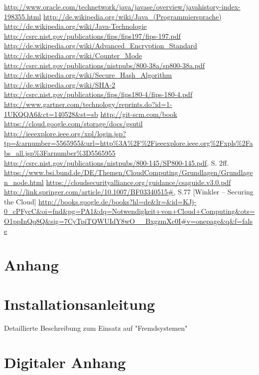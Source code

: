 \documentclass[12pt,a4paper,bibliography=totocnumbered,listof=totocnumbered]{scrartcl}
\begin{document}
 \begin{thebibliography}{xxxxxxxxxxxxxxxxxxx}
	\url{http://www.oracle.com/technetwork/java/javase/overview/javahistory-index-198355.html}
	\url{http://de.wikipedia.org/wiki/Java_(Programmiersprache)}
	\url{ http://de.wikipedia.org/wiki/Java-Technologie}
	\url{http://csrc.nist.gov/publications/fips/fips197/fips-197.pdf}
	\url{http://de.wikipedia.org/wiki/Advanced_Encryption_Standard}
	\url{http://de.wikipedia.org/wiki/Counter_Mode}
	\url{http://csrc.nist.gov/publications/nistpubs/800-38a/sp800-38a.pdf}
	\url{http://de.wikipedia.org/wiki/Secure_Hash_Algorithm}
	\url{http://de.wikipedia.org/wiki/SHA-2}
	\url{http://csrc.nist.gov/publications/fips/fips180-4/fips-180-4.pdf}
	\url{http://www.gartner.com/technology/reprints.do?id=1-1UKQQA6&ct=140528&st=sb}
 	\url{http://git-scm.com/book}
	\url{https://cloud.google.com/storage/docs/gsutil}	
	\url{http://ieeexplore.ieee.org/xpl/login.jsp?tp=&arnumber=5565955&url=http%3A%2F%2Fieeexplore.ieee.org%2Fxpls%2Fabs_all.jsp%3Farnumber%3D5565955}
	\url{http://csrc.nist.gov/publications/nistpubs/800-145/SP800-145.pdf}, S. 2ff.
	\url{https://www.bsi.bund.de/DE/Themen/CloudComputing/Grundlagen/Grundlagen_node.html}
	\url{https://cloudsecurityalliance.org/guidance/csaguide.v3.0.pdf}
	\url{http://link.springer.com/article/10.1007/BF03340515#},  S.77
	 [Winkler – Securing the Cloud]
	 \url{http://books.google.de/books?hl=de&lr=&id=KJj-0_cPFycC&oi=fnd&pg=PA1&dq=Notwendigkeit+von+Cloud+Computing&ots=O1ppInQq8Q&sig=7CyTpiTQWUIdY8wO__BxgzmXc0I#v=onepage&q&f=false}
	
\end{thebibliography}
\pagebreak

\setcounter{page}{1}

\begin{appendix}
\section*{Anhang}
{}

\section{Installationsanleitung}
Detaillierte Beschreibung zum Einsatz auf "Fremdsystemen"
\pagebreak
\section{Digitaler Anhang}
\end{appendix}
\end{document}
